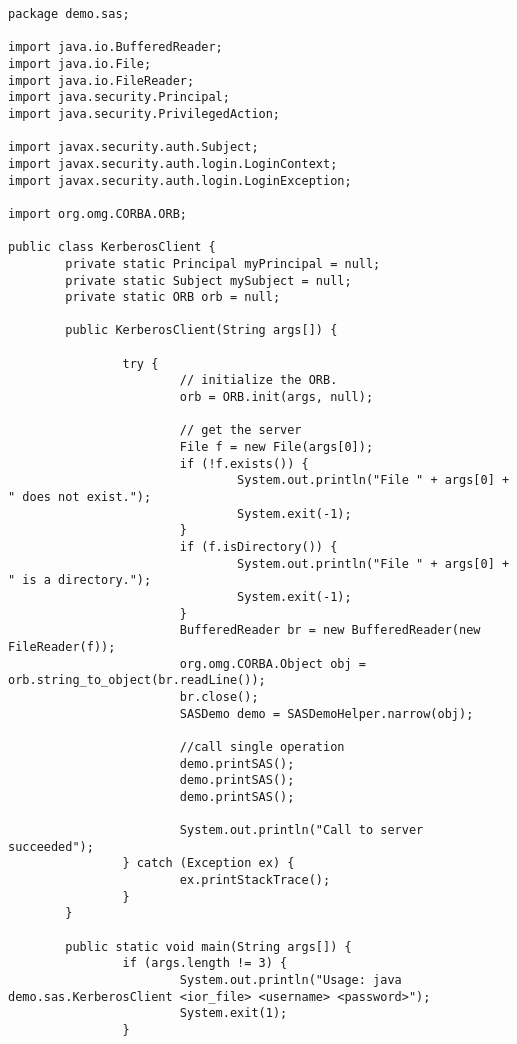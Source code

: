 \begin{scriptsize}
\begin{verbatim}
package demo.sas;

import java.io.BufferedReader;
import java.io.File;
import java.io.FileReader;
import java.security.Principal;
import java.security.PrivilegedAction;

import javax.security.auth.Subject;
import javax.security.auth.login.LoginContext;
import javax.security.auth.login.LoginException;

import org.omg.CORBA.ORB;

public class KerberosClient {
        private static Principal myPrincipal = null;
        private static Subject mySubject = null;
        private static ORB orb = null;

        public KerberosClient(String args[]) {

                try {
                        // initialize the ORB.
                        orb = ORB.init(args, null);

                        // get the server
                        File f = new File(args[0]);
                        if (!f.exists()) {
                                System.out.println("File " + args[0] + " does not exist.");
                                System.exit(-1);
                        }
                        if (f.isDirectory()) {
                                System.out.println("File " + args[0] + " is a directory.");
                                System.exit(-1);
                        }
                        BufferedReader br = new BufferedReader(new FileReader(f));
                        org.omg.CORBA.Object obj = orb.string_to_object(br.readLine());
                        br.close();
                        SASDemo demo = SASDemoHelper.narrow(obj);

                        //call single operation
                        demo.printSAS();
                        demo.printSAS();
                        demo.printSAS();

                        System.out.println("Call to server succeeded");
                } catch (Exception ex) {
                        ex.printStackTrace();
                }
        }

        public static void main(String args[]) {
                if (args.length != 3) {
                        System.out.println("Usage: java demo.sas.KerberosClient <ior_file> <username> <password>");
                        System.exit(1);
                }


\end{verbatim}
\end{scriptsize}
